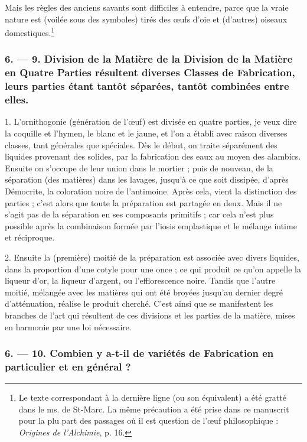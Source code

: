 \documentclass[a4paper, 11pt, oneside, polutonikogreek, french]{article}
\begin{document}
Mais les règles des anciens savants sont difficiles à entendre, parce que la vraie nature est (voilée sous des symboles) tirés des œufs d'oie et (d'autres) oiseaux domestiques.\footnote{Le texte correspondant à la dernière ligne (ou son équivalent) a été gratté dans le ms. de St-Marc. La même précaution a été prise dans ce manuscrit pour la plu part des passages où il est question de l'œuf philosophique : \emph{Origines de l'Alchimie}, p. 16.}

\bigskip
\centerline{\EightStarTaper}
\centerline{\EightStarTaper\EightStarTaper}
\bigskip

\subsubsection{6. --- 9. Division de la Matière de la Division de la Matière en Quatre Parties résultent diverses Classes de Fabrication, leurs parties étant tantôt séparées, tantôt combinées entre elles.}

1. L'ornithogonie (génération de l'œuf) est divisée en quatre parties, je veux dire la coquille et l'hymen, le blanc et le jaune, et l'on a établi avec raison diverses classes, tant générales que spéciales. Dès le début, on traite séparément des liquides provenant des solides, par la fabrication des eaux au moyen des alambics. Ensuite on s'occupe de leur union dans le mortier ; puis de nouveau, de la séparation (des matières) dans les lavages, jusqu'à ce que soit dissipée, d'après Démocrite, la coloration noire de l'antimoine. Après cela, vient la distinction des parties ; c'est alors que toute la préparation est partagée en deux. Mais il ne s'agit pas de la séparation en ses composants primitifs ; car cela n'est plus possible après la combinaison formée par l'iosis emplastique et le mélange intime et réciproque.

2. Ensuite la (première) moitié de la préparation est associée avec divers liquides, dans la proportion d'une cotyle pour une once ; ce qui produit ce qu'on appelle la liqueur d'or, la liqueur d'argent, ou l'efflorescence noire. Tandis que l'autre moitié, mélangée avec les matières qui ont été broyées jusqu'au dernier degré d'atténuation, réalise le produit cherché. C'est ainsi que se manifestent les branches de l'art qui résultent de ces divisions et les parties de la matière, mises en harmonie par une loi nécessaire.

\bigskip
\centerline{\EightStarTaper}
\centerline{\EightStarTaper\EightStarTaper}
\bigskip

\subsubsection{6. --- 10. Combien y a-t-il de variétés de Fabrication en particulier et en général ?}
\end{document}
